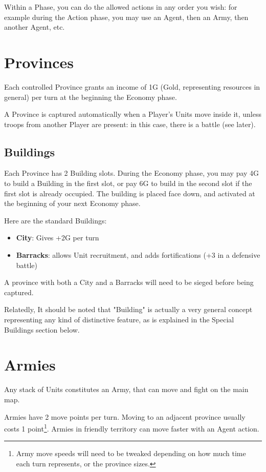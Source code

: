Within a Phase, you can do the allowed actions in any order you wish: for example during the Action phase, you may use an Agent, then an Army, then another Agent, etc.


\section{Provinces}

Each controlled Province grants an income of 1G (Gold, representing resources in general) per turn at the beginning the Economy phase.

A Province is captured automatically when a Player's Units move inside it, unless troops from another Player are present: in this case, there is a battle (see later).


\subsection{Buildings}


Each Province has 2 Building slots. During the Economy phase, you may pay 4G to build a Building in the first slot, or pay 6G to build in the second slot if the first slot is already occupied. The building is placed face down, and activated at the beginning of your next Economy phase.

Here are the standard Buildings:

\begin{itemize}
    \item \textbf{City}: Gives +2G per turn
    \item \textbf{Barracks}: allows Unit recruitment, and adds fortifications (+3 in a defensive battle)
\end{itemize}

A province with both a City and a Barracks will need to be sieged before being captured.

Relatedly, It should be noted that "Building" is actually a very general concept representing any kind of distinctive feature, as is explained in the Special Buildings section below.

\section{Armies}

Any stack of Units constitutes an Army, that can move and fight on the main map.

Armies have 2 move points per turn. Moving to an adjacent province usually costs 1 point\footnote{Army move speeds will need to be tweaked depending on how much time each turn represents, or the province sizes.}. Armies in friendly territory can move faster with an Agent action.


